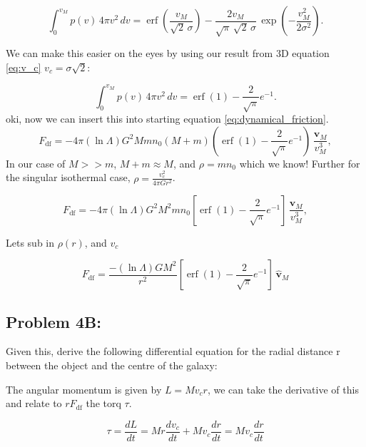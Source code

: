 \begin{equation}
    \int_{0}^{v_M} p(v)\,4\pi v^{2}\,dv 
= \operatorname{erf}\!\left(\frac{v_M}{\sqrt{2}\,\sigma}\right) 
- \frac{2v_M}{\sqrt{\pi}\,\sqrt{2}\,\sigma}\,
\exp\!\left(-\frac{v_M^{2}}{2\sigma^{2}}\right).
\end{equation}

We can make this easier on the eyes by using our result from 3D equation \ref{eq:v_c} $v_c = \sigma \sqrt{2}$:

\begin{equation}
    \int_{0}^{v_M} p(v)\,4\pi v^{2}\,dv  = \operatorname{erf}(1) - \frac{2}  {\sqrt{\pi}}e^{-1}.
\end{equation}
oki, now we can insert this into starting equation \ref{eq:dynamical_friction}.
\begin{equation} 
    F_{\mathrm{df}} 
    = -4 \pi (\ln \Lambda) G^2 M m n_0 (M+m) 
    (\operatorname{erf}(1) - \frac{2}  {\sqrt{\pi}}e^{-1}) \, \frac{\mathbf{v}_M}{v_M^3},
\end{equation}
In our case of $M >>m$, $M +m \approx M$, and $\rho = mn_0$ which we know! Further for the singular isothermal case, $\rho = \frac{v_c^2}{4\pi Gr^2}$.

\begin{equation} 
    F_{\mathrm{df}} 
    = -4 \pi (\ln \Lambda) G^2 M^2 m n_0 
    [\operatorname{erf}(1) - \frac{2}  {\sqrt{\pi}}e^{-1}] \, \frac{\mathbf{v}_M}{v_M^3},
\end{equation}

Lets sub in $\rho(r)$, and $v_c$

\begin{equation} 
    \boxed{F_{\mathrm{df}} 
    = \frac{-(\ln \Lambda) G M^2 }{r^2} 
    [\operatorname{erf}(1) - \frac{2}  {\sqrt{\pi}}e^{-1}] \, \hat{\mathbf{v}}_M} 
\end{equation}

\subsection*{Problem 4B:}
Given this,
derive the following differential equation for the radial distance r between the object and the centre of
the galaxy:

The angular momentum is given by $L = Mv_cr$, we can take the derivative of this and relate to $rF_{\mathrm{df}}$ the torq $\tau$. 

\begin{equation}
    \tau = \frac{dL}{dt} = Mr \frac{dv_c}{dt} + Mv_c\frac{dr}{dt}  = Mv_c\frac{dr}{dt}
\end{equation}

